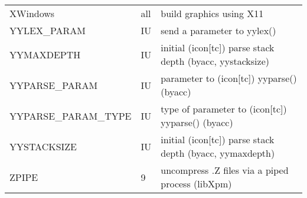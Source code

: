 \begin{xtabular}{|m{1.8in}|m{0.5in}|m{4.0in}|}
XWindows & all & build graphics using X11 \\
YYLEX\_PARAM & IU & send a parameter to yylex() \\
YYMAXDEPTH & IU & initial (icon[tc]) parse stack depth (byacc, yystacksize) \\
YYPARSE\_PARAM & IU & parameter to (icon[tc]) yyparse() (byacc) \\
YYPARSE\_PARAM\_TYPE & IU & type of parameter to (icon[tc]) yyparse() (byacc) \\
YYSTACKSIZE & IU & initial (icon[tc]) parse stack depth (byacc, yymaxdepth) \\
ZPIPE & 9 & uncompress .Z files via a piped process (libXpm) \\
\hline
\end{xtabular}
